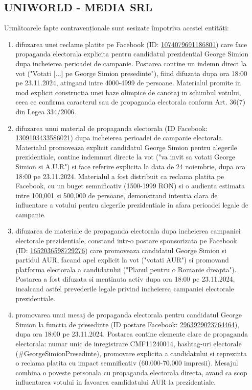 \documentclass[a4paper,12pt]{article}
\begin{document}
\vspace{0.5cm}

\subsection{UNIWORLD - MEDIA SRL}
Următoarele fapte contravenționale sunt sesizate împotriva acestei entități:

\begin{enumerate}[leftmargin=*, label=\arabic*.)]
    \item difuzarea unei reclame platite pe Facebook (ID: \href{https://www.facebook.com/ads/library/?id=1074079691186801}{1074079691186801}) care face propaganda electorala explicita pentru candidatul prezidential George Simion dupa incheierea perioadei de campanie. Postarea contine un indemn direct la vot ("Votati [...] pe George Simion presedinte"), fiind difuzata dupa ora 18:00 pe 23.11.2024, atingand intre 4000-4999 de persoane. Materialul promite in mod explicit constructia unei baze olimpice de canotaj in schimbul votului, ceea ce confirma caracterul sau de propaganda electorala conform Art. 36(7) din Legea 334/2006.
    \item difuzarea unui material de propaganda electorala (ID Facebook: \href{https://www.facebook.com/ads/library/?id=1309103433586021}{1309103433586021}) dupa incheierea perioadei de campanie electorala. Materialul promoveaza explicit candidatul George Simion pentru alegerile prezidentiale, contine indemnuri directe la vot ("va invit sa votati George Simion si A.U.R") si face referire explicita la data de 24 noiembrie, dupa ora 18:00 pe 23.11.2024. Materialul a fost distribuit ca reclama platita pe Facebook, cu un buget semnificativ (1500-1999 RON) si o audienta estimata intre 100,001 si 500,000 de persoane, demonstrand intentia clara de influentare a votului pentru alegerile prezidentiale in afara perioadei legale de campanie.
    \item difuzarea de materiale de propaganda electorala dupa incheierea campaniei electorale prezidentiale, constand intr-o postare sponsorizata pe Facebook (ID: \href{https://www.facebook.com/ads/library/?id=1652036598729276}{1652036598729276}) care promoveaza candidatul George Simion si partidul AUR, facand apel explicit la vot ("votati AUR") si promovand platforma electorala a candidatului ("Planul pentru o Romanie dreapta"). Postarea a fost difuzata si mentinuta activ dupa ora 18:00 pe 23.11.2024, incalcand astfel prevederile legale privind incheierea campaniei electorale prezidentiale.
    \item promovarea unui mesaj de propaganda electorala pentru candidatul George Simion la functia de presedinte (ID postare Facebook: \href{https://www.facebook.com/ads/library/?id=2963929023764464}{2963929023764464}), dupa ora 18:00 pe 23.11.2024. Postarea contine elemente clare de propaganda electorala: numar unic de inregistrare CMF11240014, hashtag-uri electorale (\#GeorgeSimionPresedinte), promovare explicita a candidatului si reprezinta o reclama platita cu impact semnificativ (60.000-70.000 impresii). Mesajul combina o poveste personala cu propaganda electorala directa, avand ca scop influentarea votului in favoarea candidatului AUR la prezidentiale.

\end{enumerate}
\end{document}

